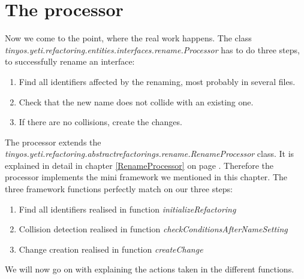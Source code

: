 \documentclass[a4paper,10pt]{report}
\begin{document}
\section{The processor}
Now we come to the point, where the real work happens.
The class {\it tinyos.yeti.refactoring.entities.interfaces.rename.Processor} has to do three steps, to successfully rename an interface:
   \begin{enumerate}
    \item Find all identifiers affected by the renaming, most probably in several files.
    \item Check that the new name does not collide with an existing one.
    \item If there are no collisions, create the changes.
   \end{enumerate}
The processor extends the {\it tinyos.yeti.refactoring.abstractrefactorings.rename.RenameProcessor} class.
It is explained in detail in chapter \ref{RenameProcessor} on page \pageref{RenameProcessor}.
Therefore the processor implements the mini framework we mentioned in this chapter.
The three framework functions perfectly match on our three steps:
   \begin{enumerate}
     \item Find all identifiers realised in function {\it initializeRefactoring}
     \item Collision detection realised in function {\it checkConditionsAfterNameSetting}
     \item Change creation realised in function {\it createChange}
   \end{enumerate}
We will now go on with explaining the actions taken in the different functions.
\end{document}
